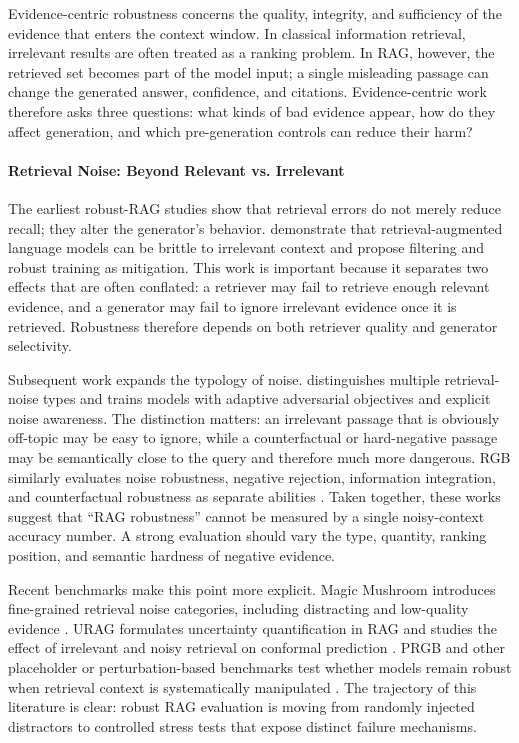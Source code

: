 
Evidence-centric robustness concerns the quality, integrity, and sufficiency of the evidence that enters the context window. In classical information retrieval, irrelevant results are often treated as a ranking problem. In RAG, however, the retrieved set becomes part of the model input; a single misleading passage can change the generated answer, confidence, and citations. Evidence-centric work therefore asks three questions: what kinds of bad evidence appear, how do they affect generation, and which pre-generation controls can reduce their harm?



\paragraph{Retrieval Noise: Beyond Relevant vs. Irrelevant}

The earliest robust-RAG studies show that retrieval errors do not merely reduce recall; they alter the generator's behavior. \citet{irrelevantContext2023} demonstrate that retrieval-augmented language models can be brittle to irrelevant context and propose filtering and robust training as mitigation. This work is important because it separates two effects that are often conflated: a retriever may fail to retrieve enough relevant evidence, and a generator may fail to ignore irrelevant evidence once it is retrieved. Robustness therefore depends on both retriever quality and generator selectivity.

Subsequent work expands the typology of noise. \citet{raat2024} distinguishes multiple retrieval-noise types and trains models with adaptive adversarial objectives and explicit noise awareness. The distinction matters: an irrelevant passage that is obviously off-topic may be easy to ignore, while a counterfactual or hard-negative passage may be semantically close to the query and therefore much more dangerous. RGB similarly evaluates noise robustness, negative rejection, information integration, and counterfactual robustness as separate abilities \citep{rgb2023}. Taken together, these works suggest that ``RAG robustness'' cannot be measured by a single noisy-context accuracy number. A strong evaluation should vary the type, quantity, ranking position, and semantic hardness of negative evidence.

Recent benchmarks make this point more explicit. Magic Mushroom introduces fine-grained retrieval noise categories, including distracting and low-quality evidence \citep{rrag027}. URAG formulates uncertainty quantification in RAG and studies the effect of irrelevant and noisy retrieval on conformal prediction \citep{rrag001}. PRGB and other placeholder or perturbation-based benchmarks test whether models remain robust when retrieval context is systematically manipulated \citep{rrag183}. The trajectory of this literature is clear: robust RAG evaluation is moving from randomly injected distractors to controlled stress tests that expose distinct failure mechanisms.

